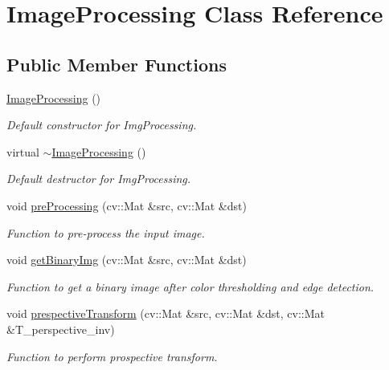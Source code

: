 \hypertarget{classImageProcessing}{}\section{Image\+Processing Class Reference}
\label{classImageProcessing}
\subsection*{Public Member Functions}
\begin{DoxyCompactItemize}
\item 
\hyperlink{classImageProcessing_a0090ffe36a912d6df5d7a1f507f6252e}{Image\+Processing} ()
\begin{DoxyCompactList}\small\item\em Default constructor for Img\+Processing. \end{DoxyCompactList}\item 
virtual \hyperlink{classImageProcessing_a1d4bd00ec1862112552c663034cebabc}{$\sim$\+Image\+Processing} ()
\begin{DoxyCompactList}\small\item\em Default destructor for Img\+Processing. \end{DoxyCompactList}\item 
void \hyperlink{classImageProcessing_a72562595d5ec6974d5e4a715ac2c3f83}{pre\+Processing} (cv\+::\+Mat \&src, cv\+::\+Mat \&dst)
\begin{DoxyCompactList}\small\item\em Function to pre-\/process the input image. \end{DoxyCompactList}\item 
void \hyperlink{classImageProcessing_ab4520086fa3735882552ab376f94a9f8}{get\+Binary\+Img} (cv\+::\+Mat \&src, cv\+::\+Mat \&dst)
\begin{DoxyCompactList}\small\item\em Function to get a binary image after color thresholding and edge detection. \end{DoxyCompactList}\item 
void \hyperlink{classImageProcessing_aec91adad633adbbb0f0c0dc7fc595655}{prespective\+Transform} (cv\+::\+Mat \&src, cv\+::\+Mat \&dst, cv\+::\+Mat \&T\+\_\+perspective\+\_\+inv)
\begin{DoxyCompactList}\small\item\em Function to perform prospective transform. \end{DoxyCompactList}\item 

\end{DoxyCompactItemize}
